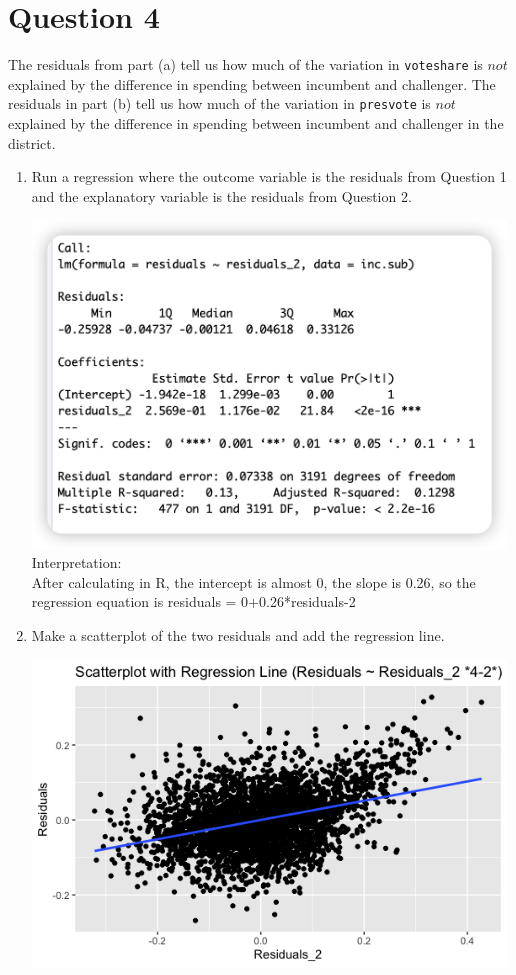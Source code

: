 \documentclass[12pt,letterpaper]{article}
\begin{document}
\section*{Question 4}
\noindent The residuals from part (a) tell us how much of the variation in \texttt{voteshare} is $not$ explained by the difference in spending between incumbent and challenger. The residuals in part (b) tell us how much of the variation in \texttt{presvote} is $not$ explained by the difference in spending between incumbent and challenger in the district.
	\begin{enumerate}
		\item Run a regression where the outcome variable is the residuals from Question 1 and the explanatory variable is the residuals from Question 2.	\vspace{1cm}
		
		\vspace{1cm}
		\includegraphics[width=0.99\textwidth]{4-1.png}	
		\vspace{1cm}
		\noindent
		Interpretation:\\
		After calculating in R, the intercept is almost 0, the slope is 0.26, so the regression equation is residuals = 0+0.26*residuals-2
		\item Make a scatterplot of the two residuals and add the regression line. 	\vspace{1cm}
		
		\vspace{1cm}
		\includegraphics[width=0.99\textwidth]{4_2.png}	

\end{enumerate}
\end{document}
